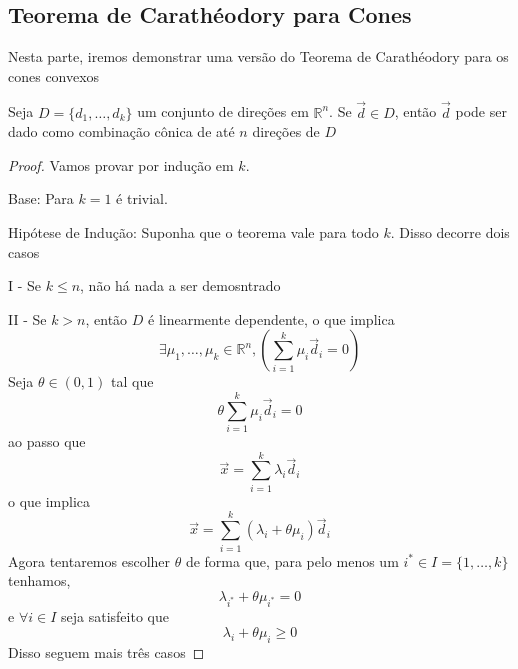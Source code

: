 \subsection{Teorema de Carathéodory para Cones}

Nesta parte, iremos demonstrar uma versão do Teorema de Carathéodory para os
cones convexos

\begin{thm:caratheodory cones}
  Seja $D = \{d_1, \dots, d_k\}$ um conjunto de direções em $\mathbb{R}^n$. Se $\vec{d} \in D$, então
  $\vec{d}$ pode ser dado como combinação cônica de até $n$ direções
  de $D$

  \begin{proof}
   Vamos provar por indução em $k$.

   Base: Para $k=1$ é trivial.

   Hipótese de Indução: Suponha que o teorema vale para todo $k$. Disso decorre
   dois casos

   I - Se $k \leq n$, não há nada a ser demosntrado

   II - Se $k > n$, então $D$ é linearmente dependente, o que implica
   \[
     \exists \mu_1, \dots, \mu_{k} \in \mathbb{R}^n, \left(\sum_{i=1}^{k}\mu_i \vec{d}_i = 0\right)
   \]
   Seja $\theta \in (0, 1)$ tal que
   \[
     \theta \sum_{i=1}^{k} \mu_i \vec{d}_i = 0
   \]
   ao passo que
   \[
     \vec{x} = \sum_{i=1}^{k}\lambda_i\vec{d}_i
   \]
   o que implica
   \[
     \vec{x} = \sum_{i=1}^{k}(\lambda_i + \theta \mu_i)\vec{d}_i
   \]
   Agora tentaremos escolher $\theta$ de forma que, para pelo menos um
   $i^{*} \in I = \{1, \dots, k\}$ tenhamos,
   \[
     \lambda_{i^*} + \theta \mu_{i^*} = 0
   \]
   e $\forall i \in I$ seja satisfeito que
   \[
     \lambda_i  + \theta \mu_i \geq 0
   \]
   Disso seguem mais três casos


\end{proof}
\end{thm:caratheodory cones}
